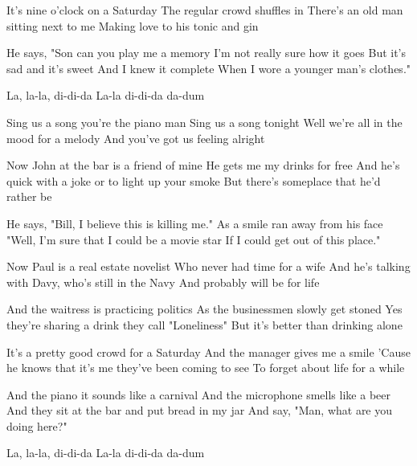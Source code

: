 \begin{verse*}
It's nine o'clock on a Saturday
The regular crowd shuffles in
There's an old man sitting next to me
Making love to his tonic and gin
\end{verse*}

\begin{verse*}
He says, "Son can you play me a memory
I'm not really sure how it goes
But it's sad and it's sweet
And I knew it complete
When I wore a younger man's clothes."
\end{verse*}

\begin{verse*}
La, la-la, di-di-da
La-la di-di-da da-dum
\end{verse*}

\begin{chorus}
Sing us a song you're the piano man
Sing us a song tonight
Well we're all in the mood for a melody
And you've got us feeling alright
\end{chorus}

\begin{verse*}
Now John at the bar is a friend of mine
He gets me my drinks for free
And he's quick with a joke or to light up your smoke
But there's someplace that he'd rather be
\end{verse*}

\begin{verse*}
He says, "Bill, I believe this is killing me."
As a smile ran away from his face
"Well, I'm sure that I could be a movie star
If I could get out of this place."
\end{verse*}

\begin{verse*}
Now Paul is a real estate novelist
Who never had time for a wife
And he's talking with Davy, who's still in the Navy
And probably will be for life
\end{verse*}

\begin{verse*}
And the waitress is practicing politics
As the businessmen slowly get stoned
Yes they're sharing a drink they call "Loneliness"
But it's better than drinking alone
\end{verse*}

\thechorus

\begin{verse*}
It's a pretty good crowd for a Saturday
And the manager gives me a smile
'Cause he knows that it's me they've been coming to see
To forget about life for a while
\end{verse*}

\begin{verse*}
And the piano it sounds like a carnival
And the microphone smells like a beer
And they sit at the bar and put bread in my jar
And say, "Man, what are you doing here?"
\end{verse*}

\begin{verse*}
La, la-la, di-di-da
La-la di-di-da da-dum
\end{verse*}

\thechorus

